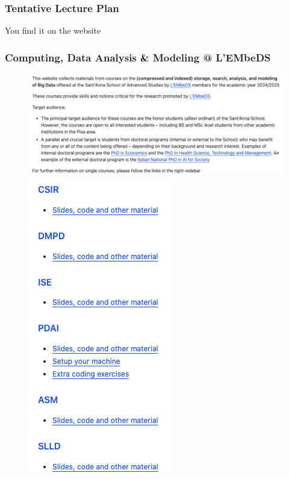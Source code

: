 \documentclass{beamer}%
\begin{document}
\begin{frame}
  \frametitle{Tentative Lecture Plan}
  \centering
  You find it on the website
  \\
  \myurl{\homepage}
\end{frame}

\begin{frame}
	\frametitle{Computing, Data Analysis \& Modeling @ L'EMbeDS}
	\centering
\begin{figure}
	\includegraphics[width=0.79\linewidth]{figures/descr.png}
		\includegraphics[width=0.19\linewidth]{figures/courses.png}
\end{figure} 
\end{frame}



%  
\end{document}
